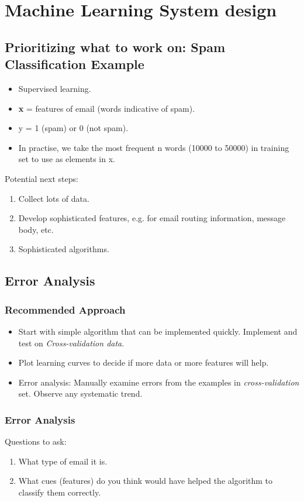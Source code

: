 \section{Machine Learning System design}

\subsection{Prioritizing what to work on: Spam Classification Example}
    \begin{itemize}
        \item Supervised learning.
        \item \textbf{x} = features of email (words indicative of spam).
        \item y = 1 (spam) or 0 (not spam). 
        \item In practise, we take the most frequent n words (10000 to 50000) in training set to use as elements in x. 
    \end{itemize}

    Potential next steps:
    \begin{enumerate}
        \item Collect lots of data.
        \item Develop sophisticated features, e.g. for email routing information, message body, etc. 
        \item Sophisticated algorithms.
    \end{enumerate}

\subsection{Error Analysis}
    \subsubsection{Recommended Approach}
        \begin{itemize}
            \item Start with simple algorithm that can be implemented quickly. Implement and test on \emph{Cross-validation data}. 
            \item Plot learning curves to decide if more data or more features will help. 
            \item Error analysis: Manually examine errors from the examples in \emph{cross-validation} set. Observe any systematic trend. 
        \end{itemize} 

    \subsubsection{Error Analysis}
        Questions to ask:
        \begin{enumerate}
            \item What type of email it is.
            \item What cues (features) do you think would have helped the algorithm to classify them correctly. 
        \end{enumerate}

